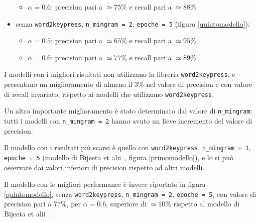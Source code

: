 \begin{itemize}
\begin{itemize}
        \item $\alpha = 0.6$: precision pari a $\simeq 75\%$ e recall pari a $\simeq 88\%$
    \end{itemize}
    \item senza \texttt{word2keypress}, \texttt{n\_mingram = 2}, \texttt{epoche = 5}
    (figura \ref{quintomodello}):
    \begin{itemize}
        \item $\alpha = 0.5$: precision pari a $\simeq 65\%$ e recall pari a $\simeq 95\%$
        \item $\alpha = 0.6$: precision pari a $\simeq 77\%$ e recall pari a $\simeq 89\%$
    \end{itemize}
\end{itemize}
I modelli con i migliori risultati non utilizzano la libreria \texttt{word2keypress}, e presentano un miglioramento di almeno il 3\% nel valore di precision e con valore di recall invariato, rispetto ai modelli che utilizzano \texttt{word2keypress}.

Un altro importante miglioramento è stato determinato dal valore di \texttt{n\_mingram}: tutti i modelli con \texttt{n\_mingram = 2} hanno avuto un lieve incremento del valore di precision.

Il modello con i risultati più scarsi è quello con \texttt{word2keypress}, \texttt{n\_mingram = 1}, \texttt{epoche = 5} (modello di Bijeeta et
alii~\cite{bijeeta}, figura \ref{primomodello}), e lo si può osservare dai valori inferiori di precision rispetto ad altri modelli.

Il modello con le migliori performance è invece riportato in figura \ref{quintomodello}, senza \texttt{word2keypress}, \texttt{n\_mingram = 2}, \texttt{epoche = 5}, con valore di precision pari a 77\%, per $\alpha = 0.6$, superiore di $\simeq 10\%$ rispetto al modello di Bijeeta et alii~\cite{bijeeta}.

